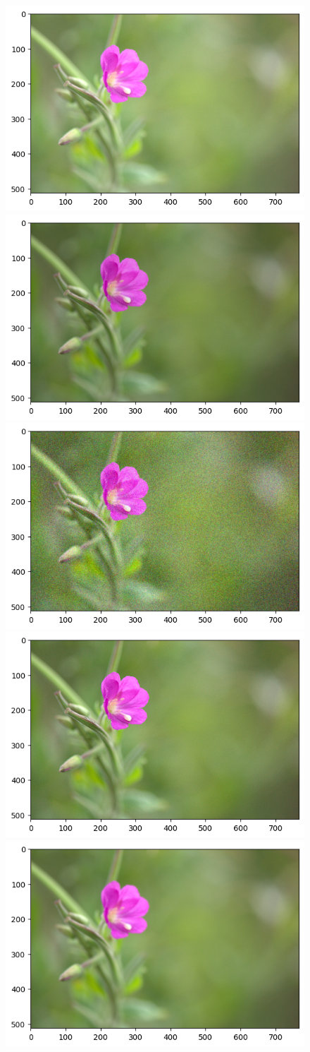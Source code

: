 \begin{figure}[H]
    \centering
    \includegraphics[width=0.45\linewidth,origin=c]{Report/Pictures/LossFuntion/Add20.png}
    \includegraphics[width=0.45\linewidth,origin=c]{Report/Pictures/LossFuntion/Mul0_9.png}
    \includegraphics[width=0.45\linewidth,origin=c]{Report/Pictures/LossFuntion/UniformNoise.png}
    \includegraphics[width=0.45\linewidth,origin=c]{Report/Pictures/LossFuntion/UnsharpMasken.png}
    \includegraphics[width=0.45\linewidth,origin=c]{Report/Pictures/LossFuntion/BoxBlur5x5.png}

\end{figure}
